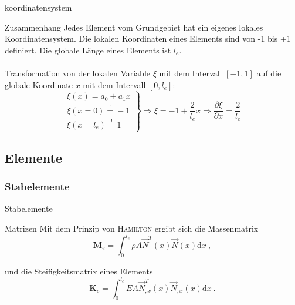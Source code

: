 \begin{frame}{koordinatensystem}
	\begin{TUBAFoutblock}{Zusammenhang}
		Jedes Element vom Grundgebiet hat ein eigenes lokales Koordinatensystem. Die lokalen Koordinaten eines Elements sind von -1 bis +1 definiert. Die globale Länge eines Elements ist $ l_{e} $.\\
		\ \\
		Transformation von der lokalen Variable $\xi$ mit dem Intervall $[-1,1]$ auf die globale Koordinate $x$ mit dem Intervall $ [0,l_{e}] $:
		\begin{equation*}
		\left. 
		\begin{array}{l}
		\xi (x) = a_{0} + a_{1}x\\
		\xi (x=0) \overset{!}{=} -1\\
		\xi (x=l_{e})  \overset{!}{=} 1
		\end{array} 
		\right\rbrace \Rightarrow 
		\xi = -1 + \frac{2}{l_{e}}x
		\Rightarrow
		\frac{\partial \xi}{\partial x} = \frac{2}{l_{e}}
		\end{equation*}		
	\end{TUBAFoutblock}
\end{frame}

\AtBeginNote{}
\AtEndNote{}

\subsection{Elemente}
\subsubsection*{Stabelemente}

\begin{frame}{Stabelemente}
	\begin{exampleblock}{Matrizen}
		Mit dem Prinzip von \textsc{Hamilton} ergibt sich die Massenmatrix
		\begin{equation*}
		\mathbf{M}_{e} = \int_{0}^{l_{e}} \rho A \vec{N}^{T}(x) \vec{N}(x) \mathrm{d}x \ ,
		\end{equation*}
		
		und die Steifigkeitsmatrix eines Elements
		\begin{equation*}
		\mathbf{K}_{e} = \int_{0}^{l_{e}} E A \vec{N}_{,x}^{T}(x) \vec{N}_{,x}(x) \mathrm{d}x \ .
		\end{equation*}
	\end{exampleblock}
\end{frame}

